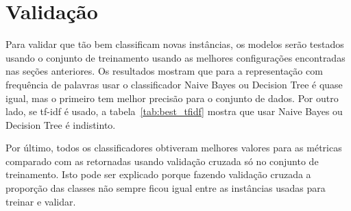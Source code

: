 \section{Validação}
\label{sec:validation}

Para validar que tão bem classificam novas instâncias, os modelos serão testados usando o conjunto de treinamento usando as melhores configurações encontradas nas seções anteriores. Os resultados mostram que para a representação com frequência de palavras usar o classificador Naive Bayes ou Decision Tree é quase igual, mas o primeiro tem melhor precisão para o conjunto de dados. Por outro lado, se tf-idf é usado, a tabela~\ref{tab:best_tfidf} mostra que usar Naive Bayes ou Decision Tree é indistinto.




Por último, todos os classificadores obtiveram melhores valores para as métricas comparado com as retornadas usando validação cruzada só no conjunto de treinamento. Isto pode ser explicado porque fazendo validação cruzada a proporção das classes não sempre ficou igual entre as instâncias usadas para treinar e validar.